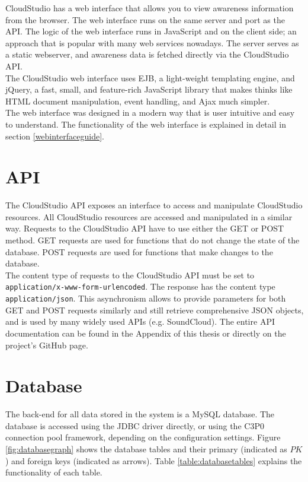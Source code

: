 CloudStudio has a web interface that allows you to view awareness information from the browser. The web interface runs on the same server and port as the API. The logic of the web interface runs in JavaScript and on the client side; an approach that is popular with many web services nowadays. The server serves as a static webserver, and awareness data is fetched directly via the CloudStudio API. \\

The CloudStudio web interface uses EJB, a light-weight templating engine, and jQuery, a fast, small, and feature-rich JavaScript library that makes thinks like HTML document manipulation, event handling, and Ajax much simpler. \\

The web interface was designed in a modern way that is user intuitive and easy to understand. The functionality of the web interface is explained in detail in section \ref{webinterfaceguide}.



\section{API}

The CloudStudio API exposes an interface to access and manipulate CloudStudio resources. All CloudStudio resources are accessed and manipulated in a similar way. Requests to the CloudStudio API have to use either the GET or POST method. GET requests are used for functions that do not change the state of the database. POST requests are used for functions that make changes to the database. \\

The content type of requests to the CloudStudio API must be set to \texttt{application/x-www-form-urlencoded}. The response has the content type \texttt{application/json}. This asynchronism allows to provide parameters for both GET and POST requests similarly and still retrieve comprehensive JSON objects, and is used by many widely used APIs (e.g. SoundCloud). The entire API documentation can be found in the Appendix of this thesis or directly on the project's GitHub page.



\section{Database}\label{database}

The back-end for all data stored in the system is a MySQL database. The database is accessed using the JDBC driver directly, or using the C3P0 connection pool framework, depending on the configuration settings. Figure \ref{fig:databasegraph} shows the database tables and their primary (indicated as $PK$) and foreign keys (indicated as arrows). Table \ref{table:databasetables} explains the functionality of each table.


